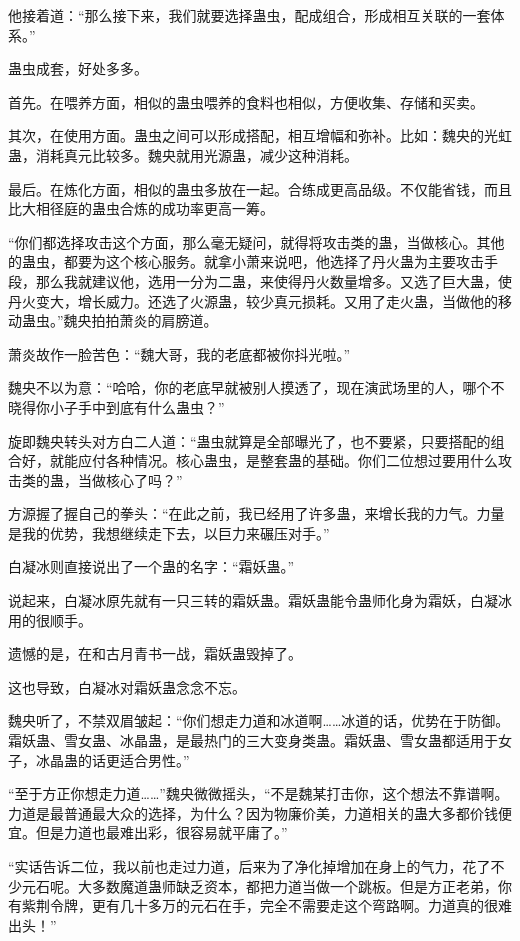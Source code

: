 \begin{this_body}
他接着道：“那么接下来，我们就要选择蛊虫，配成组合，形成相互关联的一套体系。”

蛊虫成套，好处多多。

首先。在喂养方面，相似的蛊虫喂养的食料也相似，方便收集、存储和买卖。

其次，在使用方面。蛊虫之间可以形成搭配，相互增幅和弥补。比如：魏央的光虹蛊，消耗真元比较多。魏央就用光源蛊，减少这种消耗。

最后。在炼化方面，相似的蛊虫多放在一起。合练成更高品级。不仅能省钱，而且比大相径庭的蛊虫合炼的成功率更高一筹。

“你们都选择攻击这个方面，那么毫无疑问，就得将攻击类的蛊，当做核心。其他的蛊虫，都要为这个核心服务。就拿小萧来说吧，他选择了丹火蛊为主要攻击手段，那么我就建议他，选用一分为二蛊，来使得丹火数量增多。又选了巨大蛊，使丹火变大，增长威力。还选了火源蛊，较少真元损耗。又用了走火蛊，当做他的移动蛊虫。”魏央拍拍萧炎的肩膀道。

萧炎故作一脸苦色：“魏大哥，我的老底都被你抖光啦。”

魏央不以为意：“哈哈，你的老底早就被别人摸透了，现在演武场里的人，哪个不晓得你小子手中到底有什么蛊虫？”

旋即魏央转头对方白二人道：“蛊虫就算是全部曝光了，也不要紧，只要搭配的组合好，就能应付各种情况。核心蛊虫，是整套蛊的基础。你们二位想过要用什么攻击类的蛊，当做核心了吗？”

方源握了握自己的拳头：“在此之前，我已经用了许多蛊，来增长我的力气。力量是我的优势，我想继续走下去，以巨力来碾压对手。”

白凝冰则直接说出了一个蛊的名字：“霜妖蛊。”

说起来，白凝冰原先就有一只三转的霜妖蛊。霜妖蛊能令蛊师化身为霜妖，白凝冰用的很顺手。

遗憾的是，在和古月青书一战，霜妖蛊毁掉了。

这也导致，白凝冰对霜妖蛊念念不忘。

魏央听了，不禁双眉皱起：“你们想走力道和冰道啊……冰道的话，优势在于防御。霜妖蛊、雪女蛊、冰晶蛊，是最热门的三大变身类蛊。霜妖蛊、雪女蛊都适用于女子，冰晶蛊的话更适合男性。”

“至于方正你想走力道……”魏央微微摇头，“不是魏某打击你，这个想法不靠谱啊。力道是最普通最大众的选择，为什么？因为物廉价美，力道相关的蛊大多都价钱便宜。但是力道也最难出彩，很容易就平庸了。”

“实话告诉二位，我以前也走过力道，后来为了净化掉增加在身上的气力，花了不少元石呢。大多数魔道蛊师缺乏资本，都把力道当做一个跳板。但是方正老弟，你有紫荆令牌，更有几十多万的元石在手，完全不需要走这个弯路啊。力道真的很难出头！”


\end{this_body}
